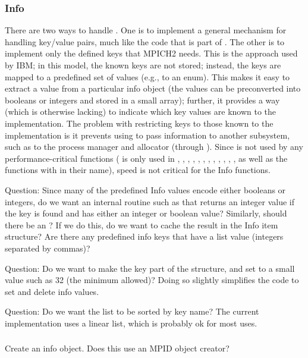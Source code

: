 \documentclass{article}
\begin{document}
\subsubsection{Info}
There are two ways to handle .  One is to implement a general
mechanism for handling key/value pairs, much like the code that is part of
.  The other is to implement only the defined keys that
MPICH2 needs.  This is the approach used by IBM; in this model, the known keys
are not stored; instead, the keys are mapped to a predefined set of values
(e.g., to an enum).  This makes it easy to extract a value from a particular
info object (the values can be preconverted into booleans or integers and
stored in a small array); further, it provides a way (which is otherwise
lacking) to 
indicate which key values are known to the implementation.  
The problem with restricting keys to those known to the implementation is it
prevents using  to pass information to another subsystem, such
as to the process manager and allocator (through ). 
Since  is not used by any performance-critical functions
( is only used in , ,
, 
, , ,
, , ,
, , 
, as well as the functions with  in their
name), speed is not critical for the Info functions.

Question: Since many of the predefined Info values encode either booleans or
integers, do we want an internal routine such as 
that returns an integer value if the key is found and has either an integer or
boolean value?  Similarly, should there be an ?
If we do this, do we want to cache the result in the Info item structure?
Are there any predefined info keys that have a list value (integers separated
by commas)?

Question: Do we want to make the key part of the structure, and set
 to a small value such as 32 (the minimum
allowed)?  Doing so slightly simplifies the code to set and delete info
values. 

Question: Do we want the list to be sorted by key name?  The current
implementation uses a linear list, which is probably ok for most uses.

\subsubsection{}
Create an info object.  Does this use an MPID object creator?
\end{document}

